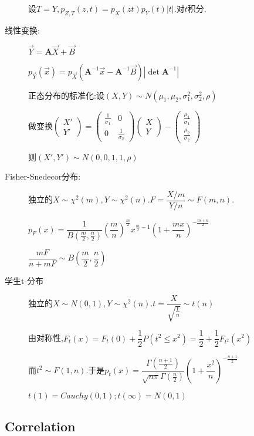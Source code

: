 \begin{description}
   设$ T=Y,p_{Z,T}(z,t)=p_X(zt)p_Y(t)|t|.$对$ t$积分.

 \item[线性变换:]$ \vec Y = \mathbf{A} \vec X + \vec B$

   $ p_{\vec Y}(\vec x)=p_{\vec X}(\mathbf{A}^{-1}\vec x-\mathbf{A}^{-1}\vec B)|\det \mathbf{A}^{-1}|$

   正态分布的标准化:设$(X,Y)\sim N(\mu_1,\mu_2,\sigma_1^2,\sigma_2^2,\rho) $

   做变换$\begin{pmatrix} X'\\Y'\end{pmatrix}=\begin{pmatrix}\frac{1}{\sigma_1}&0\\0&\frac{1}{\sigma_2}
   \end{pmatrix}\begin{pmatrix}X\\Y\end{pmatrix}-\begin{pmatrix}\frac{\mu_1}{\sigma_1}\\\frac{\mu_2}{\sigma_2}\end{pmatrix}$

   则$(X',Y')\sim N(0,0,1,1,\rho) $

 \item[Fisher-Snedecor分布:]独立的$X\sim \chi^2(m),Y\sim\chi^2(n).F=\dfrac{X/m}{Y/n}\sim F(m,n).$

   $ p_{F}(x) = \dfrac{1}{B(\frac{m}{2},\frac{n}{2})}(\dfrac{m}{n})^{\frac{m}{2}}x^{\frac{m}{2}-1}(1+\dfrac{mx}{n})^{-\frac{m+n}{2}}$

   $ \dfrac{mF}{n+mF} \sim B(\dfrac{m}{2},\dfrac{n}{2})$

 \item[学生t-分布]独立的$X\sim N(0,1),Y\sim\chi^2(n).t=\dfrac{X}{\sqrt{\frac{Y}{n}}}\sim t(n) $

   由对称性,$ F_t(x)=F_t(0)+\dfrac{1}{2}P(t^2\le x^2)=\dfrac{1}{2}+\dfrac{1}{2}F_{t^2}(x^2)$

   而$ t^2\sim F(1,n).$于是$ p_t(x)=\dfrac{\Gamma(\frac{n+1}{2})}{\sqrt{n\pi}\Gamma(\frac{n}{2})}(1+\dfrac{x^2}{n})^{-\frac{n+1}{2}}$

   $t(1) = Cauchy(0,1) ;t(\infty)=N(0,1)$
\end{description}

\subsection{Correlation}

